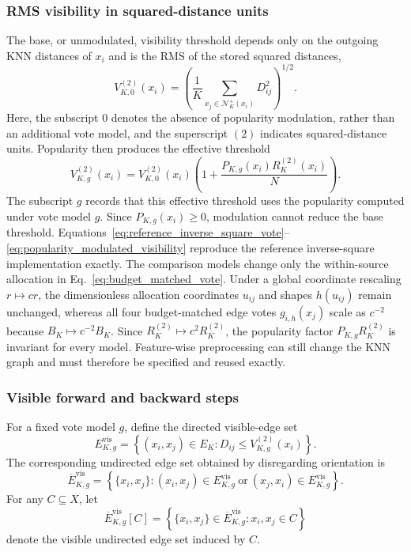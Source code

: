 \documentclass[review,12pt]{elsarticle}
\newcommand{\calN}{\mathcal{N}}
\begin{document}
\subsubsection{RMS visibility in squared-distance units}

The base, or unmodulated, visibility threshold depends only on the outgoing
KNN distances of $x_i$ and is the RMS of the stored squared distances,
\begin{equation}
V_{K,0}^{(2)}(x_i)=
\left(
\frac{1}{K}
\sum_{x_j\in\calN_K^+(x_i)}D_{ij}^{2}
\right)^{1/2}.
\label{eq:rms_visibility_base}
\end{equation}
Here, the subscript $0$ denotes the absence of popularity modulation, rather
than an additional vote model, and the superscript $(2)$ indicates
squared-distance units.
Popularity then produces the effective threshold
\begin{equation}
V_{K,g}^{(2)}(x_i)=V_{K,0}^{(2)}(x_i)
\left(1+\frac{P_{K,g}(x_i)R_K^{(2)}(x_i)}{N}\right).
\label{eq:popularity_modulated_visibility}
\end{equation}
The subscript $g$ records that this effective threshold uses the popularity
computed under vote model $g$.  Since $P_{K,g}(x_i)\geq0$, modulation cannot
reduce the base threshold.
Equations~\eqref{eq:reference_inverse_square_vote}--\eqref{eq:popularity_modulated_visibility} reproduce the reference inverse-square implementation exactly. The comparison models change only the within-source allocation in Eq.~\eqref{eq:budget_matched_vote}. Under a global coordinate rescaling $r\mapsto cr$, the dimensionless
allocation coordinates $u_{ij}$ and shapes $h(u_{ij})$ remain unchanged,
whereas all four budget-matched edge votes $g_{i,h}(x_j)$ scale as
$c^{-2}$ because $B_K\mapsto c^{-2}B_K$. Since
$R_K^{(2)}\mapsto c^2R_K^{(2)}$, the popularity factor
$P_{K,g}R_K^{(2)}$ is invariant for every model. Feature-wise preprocessing can still change the KNN graph and must therefore be specified and reused exactly.

\subsubsection{Visible forward and backward steps}

For a fixed vote model $g$, define the directed visible-edge set
\begin{equation}
E^{\mathrm{vis}}_{K,g}
=
\left\{(x_i,x_j)\in E_K:
D_{ij}\leq V_{K,g}^{(2)}(x_i)
\right\}.
\label{eq:visible_edge_set}
\end{equation}
The corresponding undirected edge set obtained by disregarding orientation is
\begin{equation}
\overline E^{\mathrm{vis}}_{K,g}
=
\left\{
\{x_i,x_j\}:
(x_i,x_j)\in E^{\mathrm{vis}}_{K,g}
\ \text{or}\
(x_j,x_i)\in E^{\mathrm{vis}}_{K,g}
\right\}.
\label{eq:symmetrised_visible_edge_set}
\end{equation}
For any $C\subseteq X$, let
\begin{equation}
\overline E^{\mathrm{vis}}_{K,g}[C]
=
\left\{
\{x_i,x_j\}\in\overline E^{\mathrm{vis}}_{K,g}:
x_i,x_j\in C
\right\}
\label{eq:induced_visible_edge_set}
\end{equation}
denote the visible undirected edge set induced by $C$.
\end{document}
